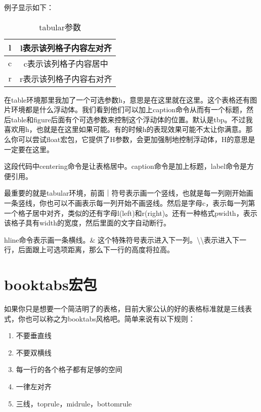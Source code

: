 \documentclass[11pt,oneside]{book}
\begin{document}
  例子显示如下：
  \begin{table}[H]
    \centering
    \begin{tabular}{|c|c|}
      \hline
      l & l表示该列格子内容左对齐 \\
      \hline
      c & c表示该列格子内容居中 \\
      \hline
      r & r表示该列格子内容右对齐 \\
      \hline
    \end{tabular}
    \caption{tabular参数}
    \label{tab:tabular参数}
  \end{table}
  在table环境那里我加了一个可选参数h，意思是在这里就在这里。这个表格还有图片环境都是什么浮动体。我们看到他们可以加上caption命令从而有一个标题，然后table和figure后面有个可选参数来控制这个浮动体的位置。默认是tbp。不过我喜欢用h，也就是在这里如果可能。有的时候h的表现效果可能不太让你满意。那么你可以尝试float宏包，它提供了H参数，会更加强制地控制浮动体，H的意思是一定要在这里。

  这段代码中centering命令是让表格居中。caption命令是加上标题，label命令是方便引用。

  最重要的就是tabular环境，前面｜符号表示画一个竖线，也就是每一列刚开始画一条竖线，你也可以不画表示每一列开始不画竖线。然后是字母c，表示每一列第一个格子居中对齐，类似的还有字母l(left)和r(right)。还有一种格式p{width}，表示该格子具有width的宽度，然后里面的文字自动断行。

  hline命令表示画一条横线。\& 这个特殊符号表示进入下一列。\textbackslash \textbackslash 表示进入下一行，后面跟上可选项距离，那么下一行的高度将拉高。


  \section{booktabs宏包}
  如果你只是想要一个简洁明了的表格，目前大家公认的好的表格标准就是三线表式，你也可以称之为booktabs风格吧。简单来说有以下规则：

  \begin{enumerate}
  \item 不要垂直线
  \item 不要双横线
  \item 每一行的各个格子都有足够的空间
  \item 一律左对齐
  \item 三线，toprule，midrule，bottomrule
  \end{enumerate}
\end{document}
